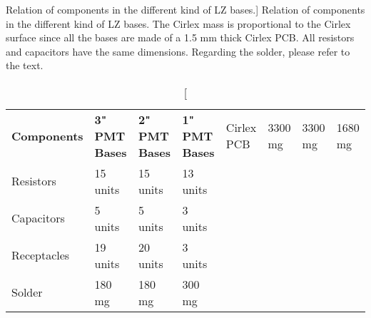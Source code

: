 \begin{table}[h]
\centering
\caption
[Relation of components in the different kind of LZ bases.]
{Relation of components in the different kind of LZ bases. The Cirlex mass is proportional to the Cirlex surface since all the bases are made of a 1.5 mm thick Cirlex PCB. All resistors and capacitors have the same dimensions. Regarding the solder, please refer to the text.}
\label{tab:pmt_base_components}
\vspace{1mm}
\renewcommand{\arraystretch}{1.2}
    \begin{tabularx}{.9\linewidth}{@{\extracolsep{\fill}}llll}
    \toprule
    
    \textbf{Components} & %
    \textbf{3" PMT Bases} & %
    \textbf{2" PMT Bases} & %
    \textbf{1" PMT Bases} & %
    
    \hline
    \hline
    
    Cirlex PCB	    & 3300 mg       & 3300 mg       & 1680 mg   \\
    Resistors       & 15 units      & 15 units      & 13 units  \\       
    Capacitors	    & 5 units       & 5 units       & 3 units   \\        
    Receptacles	    & 19 units      & 20 units      & 3 units   \\       
    Solder  	    & 180 mg        & 180 mg        & 300 mg    \\       
    
    \bottomrule
    \end{tabularx}
\end{table}

